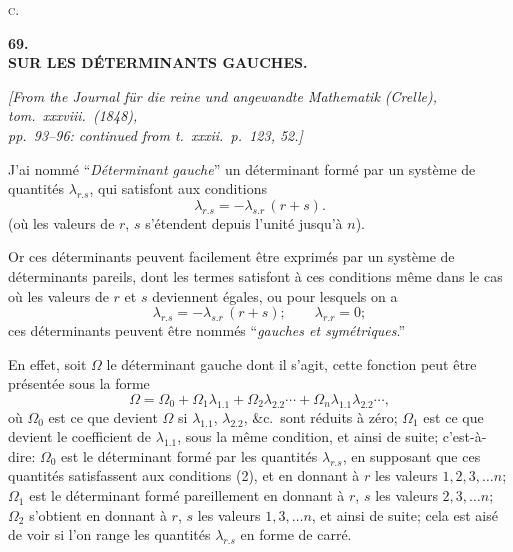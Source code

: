 \documentclass[11pt]{article}
\begin{document}
\medskip
\hfill\textsc{c.}\hspace{1em}

\vfill\pagebreak

\begin{center}
\textbf{\Large 69.}\\[1em]
\textbf{\large SUR LES D\'ETERMINANTS GAUCHES.}
\end{center}

\medskip

\begin{center}
\textit{[From the Journal f\"ur die reine und angewandte Mathematik (Crelle), tom.\ xxxviii.\ (1848),\\
pp.\ 93--96: continued from t.\ xxxii.\ p.\ 123, 52.]}
\end{center}

\medskip

J'ai nomm\'e ``\textit{D\'eterminant gauche}'' un d\'eterminant form\'e par un syst\`eme de
quantit\'es $\lambda_{r.s}$, qui satisfont aux conditions
\begin{equation}
\lambda_{r.s} = -\lambda_{s.r}\,(r + s). \tag{1}
\end{equation}
(o\`u les valeurs de $r$, $s$ s'\'etendent depuis l'unit\'e jusqu'\`a $n$).

\medskip

Or ces d\'eterminants peuvent facilement \^etre exprim\'es par un syst\`eme de d\'eterminants
pareils, dont les termes satisfont \`a ces conditions m\^eme dans le cas o\`u les
valeurs de $r$ et $s$ deviennent \'egales, ou pour lesquels on a
\begin{equation}
\lambda_{r.s} = -\lambda_{s.r}\,(r + s); \qquad \lambda_{r.r} = 0 \tag{2};
\end{equation}
ces d\'eterminants peuvent \^etre nomm\'es ``\textit{gauches et sym\'etriques}.''

\medskip

En effet, soit $\Omega$ le d\'eterminant gauche dont il s'agit, cette fonction peut \^etre
pr\'esent\'ee sous la forme
\begin{equation}
\Omega = \Omega_{0} + \Omega_{1}\lambda_{1.1} + \Omega_{2}\lambda_{2.2}\cdots + \Omega_{n}\lambda_{1.1}\lambda_{2.2}\cdots, \tag{3}
\end{equation}
o\`u $\Omega_{0}$ est ce que devient $\Omega$ si $\lambda_{1.1}$, $\lambda_{2.2}$, \&c.\ sont r\'eduits \`a z\'ero; $\Omega_{1}$ est ce que devient
le coefficient de $\lambda_{1.1}$, sous la m\^eme condition, et ainsi de suite; c'est-\`a-dire: $\Omega_{0}$ est
le d\'eterminant form\'e par les quantit\'es $\lambda_{r.s}$, en supposant que ces quantit\'es satisfassent
aux conditions (2), et en donnant \`a $r$ les valeurs $1, 2, 3, \ldots n$; $\Omega_{1}$ est le d\'eterminant
form\'e pareillement en donnant \`a $r$, $s$ les valeurs $2, 3, \ldots n$; $\Omega_{2}$ s'obtient en donnant
\`a $r$, $s$ les valeurs $1, 3, \ldots n$, et ainsi de suite; cela est ais\'e de voir si l'on range les
quantit\'es $\lambda_{r.s}$ en forme de carr\'e.
\end{document}
